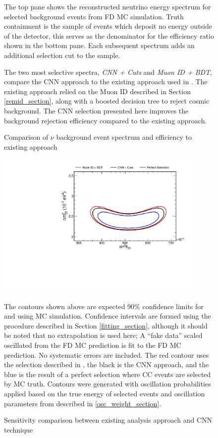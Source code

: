 \begin{figure}
\begin{center}
\end{center}
\vspace{-10pt}
\caption{Comparison of $\nu$ background event spectrum and efficiency to
existing approach}{
The top pane shows the reconstructed neutrino energy spectrum
for selected background events from FD MC simulation.
Truth containment is the sample of events which deposit
no energy outside of the detector, this serves as the denominator
for the efficiency ratio shown in the bottom pane.
Each subsequent spectrum adds an additional selection cut to the sample.

The two most selective spectra, \textit{CNN + Cuts} and
\textit{Muon ID + BDT}, compare
the CNN approach to the existing approach used in \cite{nova2016numu}.
The existing approach relied on the Muon ID described in
Section \ref{remid_section}, along with a boosted decision tree
\cite{friedman2002stochastic} to reject cosmic background.
The CNN selection presented here improves the background rejection efficiency
compared to the existing approach.
}
\label{cut_flow_comp_bkg}
\end{figure}



\begin{figure}
\begin{center}
\includegraphics[width=0.9\textwidth]{figures/selection/contoursfhc1cosmic.pdf}
\end{center}
\caption{Sensitivity comparison between existing analysis approach and CNN
technique}{
The contours shown above are expected 90\% confidence limits for \deltamtht
and \thetatth using \nova MC simulation.
Confidence intervals are formed using the procedure described in Section
\ref{fitting_section}, although it should be noted that no extrapolation
is used here; A ``fake data'' scaled oscillated from the FD MC prediction
is fit to the FD MC prediction.
No systematic errors are included.
The red contour uses the selection described in \cite{nova2016numu}, the black
is the CNN approach, and the blue is the result of a perfect selection where
\numu CC events are selected by MC truth.
Contours were generated with oscillation probabilities applied
based on the true energy of selected events and oscillation parameters
from described in \ref{osc_weight_section}.

}
\label{contour_improvement}
\end{figure}
\clearpage


